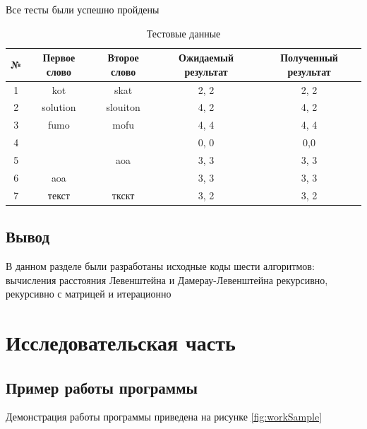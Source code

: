 \documentclass[12pt]{report}
\begin{document}
    Все тесты были успешно пройдены

    \begin{table}[H]
        \centering
        \caption{Тестовые данные}
        \label{tab:tests}
        \begin{tabular}{|c c c c c|}
            \hline
            № & Первое слово & Второе слово & Ожидаемый результат & Полученный результат \\ [0.8ex]
            \hline
            1 & kot          & skat         & 2, 2                & 2, 2                 \\
            \hline
            2 & solution     & slouiton     & 4, 2                & 4, 2                 \\
            \hline
            3 & fumo         & mofu         & 4, 4                & 4, 4                 \\
            \hline
            4 &              &              & 0, 0                & 0,0                  \\
            \hline
            5 &              & aoa          & 3, 3                & 3, 3                 \\
            \hline
            6 & aoa          &              & 3, 3                & 3, 3                 \\
            \hline
            7 & текст        & ткскт        & 3, 2                & 3, 2                 \\
            \hline
        \end{tabular}
    \end{table}


    \section{Вывод}
    В данном разделе были разработаны исходные коды шести алгоритмов: вычисления расстояния
    Левенштейна и Дамерау-Левенштейна рекурсивно, рекурсивно с матрицей и итерационно


    \chapter{Исследовательская часть}


    \section{Пример работы программы}
    Демонстрация работы программы приведена на рисунке \ref{fig:workSample}
\end{document}
